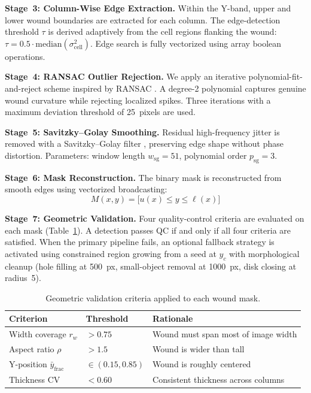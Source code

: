 \textbf{Stage~3: Column-Wise Edge Extraction.}
Within the Y-band, upper and lower wound boundaries are extracted for each column.
The edge-detection threshold $\tau$ is derived adaptively from the cell regions flanking the
wound: $\tau = 0.5 \cdot \text{median}(\sigma^2_\text{cell})$.
Edge search is fully vectorized using array boolean operations.

\textbf{Stage~4: RANSAC Outlier Rejection.}
We apply an iterative polynomial-fit-and-reject scheme inspired by RANSAC
\citep{Fischler1981}.
A degree-2 polynomial captures genuine wound curvature while rejecting localized spikes.
Three iterations with a maximum deviation threshold of 25~pixels are used.

\textbf{Stage~5: Savitzky--Golay Smoothing.}
Residual high-frequency jitter is removed with a Savitzky--Golay filter \citep{Savitzky1964},
preserving edge shape without phase distortion.
Parameters: window length $w_\text{sg} = 51$, polynomial order $p_\text{sg} = 3$.

\textbf{Stage~6: Mask Reconstruction.}
The binary mask is reconstructed from smooth edges using vectorized broadcasting:
\begin{equation}
	M(x, y) = \bigl[u(x) \leq y \leq \ell(x)\bigr] 
	\label{eq:mask-reconstruction}
\end{equation}

\textbf{Stage~7: Geometric Validation.}
Four quality-control criteria are evaluated on each mask (Table~\ref{tab:qc-criteria}). A detection passes QC if and only if all four criteria are satisfied.
When the primary pipeline fails, an optional fallback strategy is activated using constrained
region growing from a seed at $y_c$ with morphological cleanup
(hole filling at 500~px, small-object removal at 1000~px, disk closing at radius~5).

\begin{table}[htbp]
	\centering
	\caption{Geometric validation criteria applied to each wound mask.}
	\label{tab:qc-criteria}
	\begin{tabular}{llp{6.5cm}}
		\toprule
		Criterion & Threshold & Rationale \\
		\midrule
		Width coverage $r_w$       & $> 0.75$           & Wound must span most of image width \\
		Aspect ratio $\rho$         & $> 1.5$            & Wound is wider than tall \\
		Y-position $\bar{y}_\text{frac}$ & $\in (0.15, 0.85)$ & Wound is roughly centered \\
		Thickness CV                & $< 0.60$           & Consistent thickness across columns \\
		\bottomrule
	\end{tabular}
\end{table}



